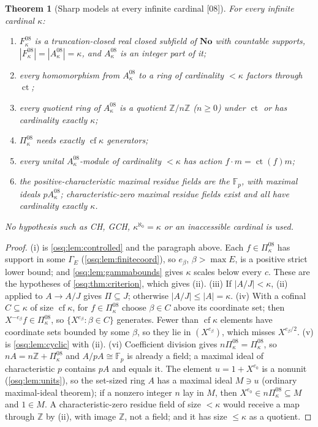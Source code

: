 \documentclass[11pt,letterpaper]{article}
\numberwithin{equation}{section}
\newtheorem{theorem}{Theorem}[section]
\theoremstyle{definition}
\theoremstyle{remark}
\theoremstyle{plain}
\newcommand{\No}{\mathbf{No}}
\newcommand{\Z}{\mathbb Z}
\newcommand{\F}{\mathbb F}
\newcommand{\ct}{\operatorname{ct}}
\newcommand{\cf}{\operatorname{cf}}
\newcommand{\src}[1]{\textup{\textsf{[#1]}}}
\begin{document}
\begin{theorem}[Sharp models at every infinite cardinal \src{08}]\label{osq:thm:model08}
For every infinite cardinal $\kappa$:
\begin{enumerate}
\item $F^{08}_\kappa$ is a truncation-closed real closed subfield of $\No$ with countable supports,
$|F^{08}_\kappa|=|A^{08}_\kappa|=\kappa$, and $A^{08}_\kappa$ is an integer part of it;
\item every homomorphism from $A^{08}_\kappa$ to a ring of cardinality $<\kappa$ factors through $\ct$;
\item every quotient ring of $A^{08}_\kappa$ is a quotient $\Z/n\Z$ ($n\ge0$) under $\ct$ or has cardinality
exactly $\kappa$;
\item $\Pi^{08}_\kappa$ needs exactly $\cf\kappa$ generators;
\item every unital $A^{08}_\kappa$-module of cardinality $<\kappa$ has action $f\cdot m=\ct(f)m$;
\item the positive-characteristic maximal residue fields are the $\F_p$, with maximal ideals $pA^{08}_\kappa$;
characteristic-zero maximal residue fields exist and all have cardinality exactly $\kappa$.
\end{enumerate}
No hypothesis such as CH, GCH, $\kappa^{\aleph_0}=\kappa$ or an
inaccessible cardinal is used.
\end{theorem}
\begin{proof}
(i) is \cref{osq:lem:controlled} and the paragraph above. Each $f\in\Pi^{08}_\kappa$ has support in some
$\Gamma_E$ (\cref{osq:lem:finitecoord}), so $e_\beta$, $\beta>\max E$, is a positive strict lower bound; and
\cref{osq:lem:gammabounds} gives $\kappa$ scales below every $c$. These are the hypotheses of
\cref{osq:thm:criterion}, which gives (ii).
(iii) If $|A/J|<\kappa$, (ii) applied to $A\to A/J$ gives $\Pi\subseteq J$; otherwise $|A/J|\le|A|=\kappa$.
(iv) With a cofinal $C\subseteq\kappa$ of size $\cf\kappa$, for $f\in\Pi^{08}_\kappa$ choose $\beta\in C$ above
its coordinate set; then $X^{-e_\beta}f\in\Pi^{08}_\kappa$, so $\{X^{e_\beta}:\beta\in C\}$ generates.
Fewer than $\cf\kappa$ elements have coordinate sets bounded by some $\beta$, so they lie in $(X^{e_\beta})$,
which misses $X^{e_\beta/2}$. (v) is \cref{osq:lem:cyclic} with (ii). (vi) Coefficient division gives
$n\Pi^{08}_\kappa=\Pi^{08}_\kappa$, so $nA=n\Z+\Pi^{08}_\kappa$ and $A/pA\cong\F_p$ is already a field; a maximal
ideal of characteristic $p$ contains $pA$ and equals it. The element $u=1+X^{e_0}$ is a nonunit
(\cref{osq:lem:units}), so the set-sized ring $A$ has a maximal ideal $M\ni u$ (ordinary maximal-ideal
theorem); if a nonzero integer $n$ lay in $M$, then $X^{e_0}\in n\Pi^{08}_\kappa\subseteq M$ and $1\in M$. A
characteristic-zero residue field of size $<\kappa$ would receive a map through $\Z$ by (ii), with image $\Z$,
not a field; and it has size $\le\kappa$ as a quotient.
\end{proof}
\end{document}
